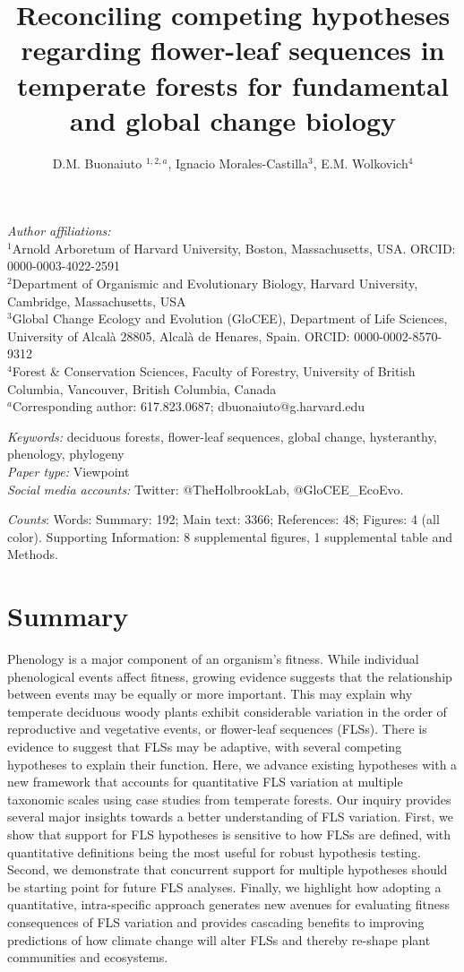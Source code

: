 \documentclass[11pt]{article}
\title{Reconciling competing hypotheses regarding flower-leaf sequences in temperate forests for fundamental and global change biology}
\date{}
\author{D.M. Buonaiuto $^{1,2,a}$, Ignacio Morales-Castilla$^{3}$, E.M. Wolkovich$^{4}$}
\begin{document}
\maketitle
\linenumbers
\noindent \emph{Author affiliations:}\\
\noindent $^1$Arnold Arboretum of Harvard University, Boston, Massachusetts, USA. ORCID: 0000-0003-4022-2591\\
$^2$Department of Organismic and Evolutionary Biology, Harvard University, Cambridge, Massachusetts, USA \\
$^3$Global Change Ecology and Evolution (GloCEE), Department of Life Sciences, University of Alcal\`a  28805, Alcal\`a de Henares, Spain. ORCID: 0000-0002-8570-9312\\
$^4$Forest \& Conservation Sciences, Faculty of Forestry, University of British Columbia, Vancouver, British Columbia, Canada\\
$^a$Corresponding author: 617.823.0687; dbuonaiuto@g.harvard.edu

\noindent \emph{Keywords:} deciduous forests, flower-leaf sequences, global change, hysteranthy, phenology, phylogeny \\ 
\emph{Paper type:} Viewpoint\\
\emph{Social media accounts:} Twitter: @TheHolbrookLab, @GloCEE\_EcoEvo.   

 \emph{Counts}: Words: Summary: 192; Main text: 3366; References: 48;  Figures: 4 (all color). Supporting Information: 8 supplemental figures, 1 supplemental table and Methods.
\newpage

\section*{Summary}
Phenology is a major component of an organism's fitness. While individual phenological events affect fitness, growing evidence suggests that the relationship between events may be equally or more important. This may explain why temperate deciduous woody plants exhibit considerable variation in the order of reproductive and vegetative events, or flower-leaf sequences (FLSs). There is evidence to suggest that FLSs may be adaptive, with several competing hypotheses to explain their function. Here, we advance existing hypotheses with a new framework that accounts for quantitative FLS variation at multiple taxonomic scales using case studies from temperate forests. Our inquiry provides several major insights towards a better understanding of FLS variation. First, we show that support for FLS hypotheses is sensitive to how FLSs are defined, with quantitative definitions being the most useful for robust hypothesis testing. Second, we demonstrate that concurrent support for multiple hypotheses should be starting point for future FLS analyses. Finally, we highlight how adopting a quantitative, intra-specific approach generates new avenues for evaluating fitness consequences of FLS variation and provides cascading benefits to improving predictions of how climate change will alter FLSs and thereby re-shape plant communities and ecosystems.
\end{document}

